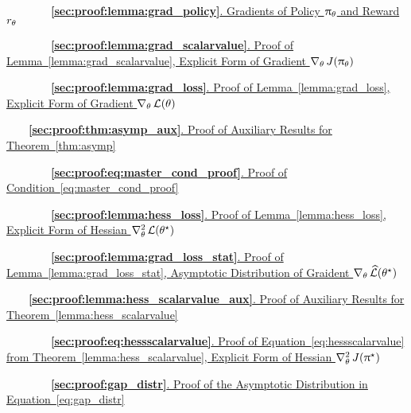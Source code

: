 {~~~~~~~~\hyperref[sec:proof:lemma:grad_policy]
{\textbf{\ref{sec:proof:lemma:grad_policy}}.
Gradients of Policy $\uppi_{\theta}$ and Reward $r_{\theta}$ }
\dotfill
\pageref{sec:proof:lemma:grad_policy}

~~~~~~~~\hyperref[sec:proof:lemma:grad_scalarvalue]
{\textbf{\ref{sec:proof:lemma:grad_scalarvalue}}.
Proof of Lemma~\ref{lemma:grad_scalarvalue}, Explicit Form of Gradient $\nabla_{\theta} \,  J(\uppi_{\theta})$ }
\dotfill
\pageref{sec:proof:lemma:grad_scalarvalue}

~~~~~~~~\hyperref[sec:proof:lemma:grad_loss]
{\textbf{\ref{sec:proof:lemma:grad_loss}}.
Proof of Lemma~\ref{lemma:grad_loss}, Explicit Form of Gradient $\nabla_{\theta} \,  \mathcal{L}(\theta)$}
\dotfill
\pageref{sec:proof:lemma:grad_loss}

~~~~\hyperref[sec:proof:thm:asymp_aux]
{\textbf{\ref{sec:proof:thm:asymp_aux}}.
Proof of Auxiliary Results for Theorem~\ref{thm:asymp}}
\dotfill
\pageref{sec:proof:thm:asymp_aux}

~~~~~~~~\hyperref[sec:proof:eq:master_cond_proof]
{\textbf{\ref{sec:proof:eq:master_cond_proof}}.
Proof of Condition~\eqref{eq:master_cond_proof}}
\dotfill
\pageref{sec:proof:eq:master_cond_proof}

~~~~~~~~\hyperref[sec:proof:lemma:hess_loss]
{\textbf{\ref{sec:proof:lemma:hess_loss}}.
Proof of Lemma~\ref{lemma:hess_loss}, Explicit Form of Hessian $\nabla_{\theta}^2 \,  \mathcal{L}(\theta^{\star})$}
\dotfill
\pageref{sec:proof:lemma:hess_loss}

~~~~~~~~\hyperref[sec:proof:lemma:grad_loss_stat]
{\textbf{\ref{sec:proof:lemma:grad_loss_stat}}.
Proof of Lemma~\ref{lemma:grad_loss_stat}, Asymptotic Distribution of Graident $\nabla_{\theta} \,  \widehat{\mathcal{L}}(\theta^{\star})$ }
\dotfill
\pageref{sec:proof:lemma:grad_loss_stat}

~~~~\hyperref[sec:proof:lemma:hess_scalarvalue_aux]
{\textbf{\ref{sec:proof:lemma:hess_scalarvalue_aux}}.
Proof of Auxiliary Results for Theorem~\ref{lemma:hess_scalarvalue}}
\dotfill
\pageref{sec:proof:lemma:hess_scalarvalue_aux}

~~~~~~~~\hyperref[sec:proof:eq:hessscalarvalue]
{\textbf{\ref{sec:proof:eq:hessscalarvalue}}.
Proof of Equation~\eqref{eq:hessscalarvalue} from Theorem~\ref{lemma:hess_scalarvalue}, Explicit Form of Hessian $\nabla_{\theta}^2 \,  J(\uppi^{\star})$}
\dotfill
\pageref{sec:proof:eq:hessscalarvalue}

~~~~~~~~\hyperref[sec:proof:gap_distr]
{\textbf{\ref{sec:proof:gap_distr}}.
Proof of the Asymptotic Distribution in Equation~\eqref{eq:gap_distr}}
\dotfill
\pageref{sec:proof:gap_distr}

}
